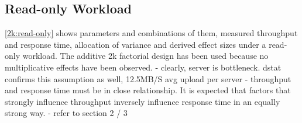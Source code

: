 \documentclass[11pt,a4paper]{article}
\begin{document}
\subsection{Read-only Workload}

\autoref{2k:read-only} shows parameters and combinations of them, measured throughput and response time, allocation of variance and derived effect sizes under a read-only workload. The additive 2k factorial design has been used because no multiplicative effects have been observed.
- clearly, server is bottleneck. dstat confirms this assumption as well, 12.5MB/S avg upload per server
- throughput and response time must be in close relationship. It is expected that factors that strongly influence throughput inversely influence response time in an equally strong way.
- refer to section 2 / 3
\end{document}
